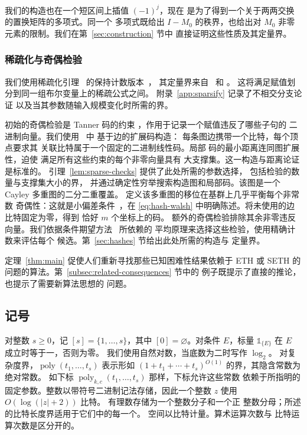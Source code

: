 \documentclass[11pt,reqno]{amsart}
\numberwithin{equation}{section}
\theoremstyle{definition}\newtheorem{definition}[theorem]{定义}
\theoremstyle{remark}\newtheorem{remark}[theorem]{注}
\newcommand{\poly}{\operatorname{poly}}
\renewcommand{\ge}{\geqslant}
\begin{document}
我们的构造也在一个短区间上插值 $(-1)^j$，现在
是为了得到一个关于两两交换的置换矩阵的多项式。同一个
多项式既给出 $I-M_0$ 的秩界，也给出对 $M_0$
非零元素的限制。我们在第~\ref{sec:construction} 节中
直接证明这些性质及其定量界。

\subsubsection{稀疏化与奇偶检验}\label{subsec:related-reductions}
我们使用稀疏化引理~\cite{IPZ} 的保持计数版本~\cite[附录~A]{DHMTW}，
其定量界来自~\cite[第~6 节]{CIP} 和
\cite[引理~5.14 与等式~(5.4)]{CalabroThesis}。
这将满足赋值划分到同一组布尔变量上的稀疏公式之间。
附录~\ref{app:sparsify} 记录了不相交分支论证
以及当其参数随输入规模变化时所需的界。

初始的奇偶检验是 Tanner 码的约束
\cite[第~II 节]{Tanner81}，作用于记录一个赋值违反了哪些子句的
二进制向量。我们使用~\cite[第~IV 与~VI 节]{SS96} 中
基于边的扩展码构造：
每条图边携带一个比特，每个顶点要求其
关联比特属于一个固定的二进制线性码。局部
码的最小距离连同图扩展性，迫使
满足所有这些约束的每个非零向量具有
大支撑集。这一构造与距离论证是标准的。
引理~\ref{lem:sparse-checks} 提供了此处所需的参数选择，
包括检验的数量与支撑集大小的界，
并通过确定性穷举搜索构造图和局部码。该图是一个 Cayley 多重图的二分二重覆盖。
定义该多重图的移位在基群上几乎平衡每个非常数
奇偶性：这就是小偏差条件~\cite{NN93,AR94}，在
\eqref{eq:hash-walsh} 中明确陈述。将未使用的边比特固定为零，得到
恰好 $m$ 个坐标上的码。
额外的奇偶检验排除其余非零违反
向量。我们依据条件期望方法~\cite{Raghavan88} 所依赖的
平均原理来选择这些检验，使用精确计数来评估每个
候选。第~\ref{sec:hashes} 节给出此处所需的构造与
定量界。

定理~\ref{thm:main} 促使人们重新寻找那些已知困难性结果依赖于 ETH 或 SETH 的
问题的算法。第~\ref{subsec:related-consequences} 节中的
例子既提示了直接的推论，也提示了需要新算法思想的
问题。

\subsection{记号}\label{subsec:notation}
对整数 $s\ge0$，记 $[s]=\{1,\ldots,s\}$，其中
$[0]=\varnothing$。对条件 $E$，标量
$\mathds{1}_{\{E\}}$ 在 $E$ 成立时等于一，否则为零。
我们使用自然对数，当底数为二时写作 $\log_2$。
对复杂度界，$\poly(t_1,\ldots,t_s)$ 表示形如
$(1+t_1+\cdots+t_s)^{O(1)}$ 的界，其隐含常数为绝对常数。
如下标 $\poly_{k,c}(t_1,\ldots,t_s)$ 那样，下标允许这些常数
依赖于所指明的固定参数。整数以带符号二进制记法存储，因此一个整数 $z$ 使用 $O(\log(|z|+2))$ 比特。
有理数存储为一个整数分子和一个正
整数分母；所述的比特长度界适用于它们中的每一个。
空间以比特计量。算术运算次数与
比特运算次数是区分开的。
\end{document}
